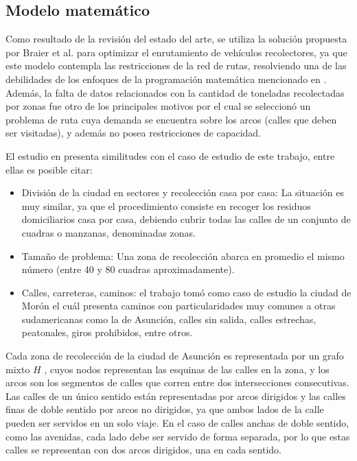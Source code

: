 \documentclass[conference,compsoc]{IEEEtran}
\begin{document}
\subsection{Modelo matemático}

Como resultado de la revisión del estado del arte, se utiliza la solución propuesta por Braier et al. \cite{Braier2017AnArgentina} para optimizar el enrutamiento de vehículos recolectores, ya que este modelo contempla las restricciones de la red de rutas, resolviendo una de las debilidades de los enfoques de la programación matemática mencionado en \cite{Sulemana2018OptimalMethods}. Además, la falta de datos relacionados con la cantidad de toneladas recolectadas por zonas fue otro de los principales motivos por el cual se seleccionó un problema de ruta cuya demanda se encuentra sobre los arcos (calles que deben ser visitadas), y además no posea restricciones de capacidad.

El estudio en \cite{Braier2017AnArgentina} presenta similitudes con el caso de estudio de este trabajo, entre ellas es posible citar:

\begin{itemize}
    \item División de la ciudad en sectores y recolección casa por casa: La situación es muy similar, ya que el procedimiento consiste en recoger los residuos domiciliarios casa por casa, debiendo cubrir todas las calles de un conjunto de cuadras o manzanas, denominadas zonas.
    \item Tamaño de problema: Una zona de recolección abarca en promedio el mismo número (entre 40 y 80 cuadras aproximadamente).
    \item Calles, carreteras, caminos: el trabajo \cite{Braier2017AnArgentina} tomó como caso de estudio la ciudad de Morón el cuál presenta caminos con particularidades muy comunes a otras sudamericanas como la de Asunción, calles sin salida, calles estrechas, peatonales, giros prohibidos, entre otros.
\end{itemize}

Cada zona de recolección de la ciudad de Asunción es representada por un grafo mixto $H$ \cite{Braier2017AnArgentina}, cuyos nodos representan las esquinas de las calles en la zona, y los arcos son los segmentos de calles que corren entre dos intersecciones consecutivas. Las calles de un único sentido están representadas por arcos dirigidos y las calles finas de doble sentido por arcos no dirigidos, ya que ambos lados de la calle pueden ser servidos en un solo viaje. En el caso de calles anchas de doble sentido, como las avenidas, cada lado debe ser servido de forma separada, por lo que estas calles se representan con dos arcos dirigidos, una en cada sentido.
\end{document}
